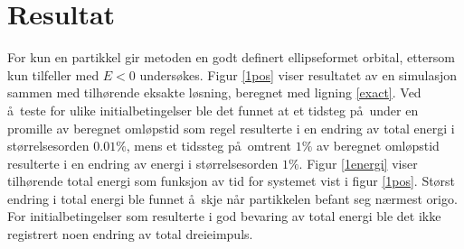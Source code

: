 \documentclass[5p]{elsarticle}        %
\begin{document}
\section{Resultat}
For kun en partikkel gir metoden en godt definert ellipseformet orbital, ettersom kun tilfeller med $E<0$ unders\o kes. Figur \ref{1pos} viser resultatet av en simulasjon sammen med tilh\o rende eksakte l\o sning, beregnet med ligning \eqref{exact}. Ved \aa \ teste for ulike initialbetingelser ble det funnet at et tidsteg p\aa \ under en promille av beregnet oml\o pstid som regel resulterte i en endring av total energi i st\o rrelsesorden $0.01\%$, mens et tidssteg p\aa \ omtrent $1\%$ av beregnet oml\o pstid resulterte i en endring av energi i st\o rrelsesorden $1\%$. Figur \ref{1energi} viser tilh\o rende total energi som funksjon av tid for systemet vist i figur \ref{1pos}. St\o rst endring i total energi ble funnet \aa \ skje n\aa r partikkelen befant seg n\ae rmest origo. For initialbetingelser som resulterte i god bevaring av total energi ble det ikke registrert noen endring av total dreieimpuls.
\end{document}
